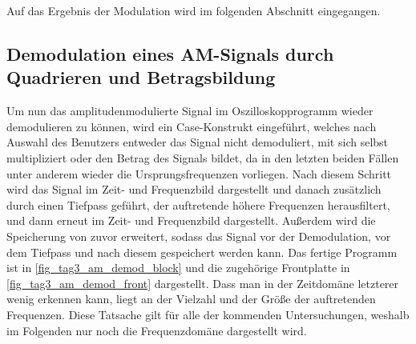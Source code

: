 \documentclass[
a4paper,
12pt,
pagesize,
ngerman
]{scrartcl}
\begin{document}
	Auf das Ergebnis der Modulation wird im folgenden Abschnitt eingegangen.
	
	
	\subsection{Demodulation eines AM-Signals durch Quadrieren und Betragsbildung} \label{DemodulationAM}
	Um nun das amplitudenmodulierte Signal im Oszilloskopprogramm wieder demodulieren zu können, wird ein Case-Konstrukt eingeführt, welches nach Auswahl des Benutzers entweder das Signal nicht demoduliert, mit sich selbst multipliziert oder den Betrag des Signals bildet, da in den letzten beiden Fällen unter anderem wieder die Ursprungsfrequenzen vorliegen.
	Nach diesem Schritt wird das Signal im Zeit- und Frequenzbild dargestellt und danach zusätzlich durch einen Tiefpass geführt, der auftretende höhere Frequenzen herausfiltert, und dann erneut im Zeit- und Frequenzbild dargestellt.
	Außerdem wird die Speicherung von zuvor erweitert, sodass das Signal vor der Demodulation, vor dem Tiefpass und nach diesem gespeichert werden kann.
	Das fertige Programm ist in \cref{fig_tag3_am_demod_block} und die zugehörige Frontplatte in \cref{fig_tag3_am_demod_front} dargestellt.
	Dass man in der Zeitdomäne letzterer wenig erkennen kann, liegt an der Vielzahl und der Größe der auftretenden Frequenzen.
	Diese Tatsache gilt für alle der kommenden Untersuchungen, weshalb im Folgenden nur noch die Frequenzdomäne dargestellt wird.
	
\end{document}
